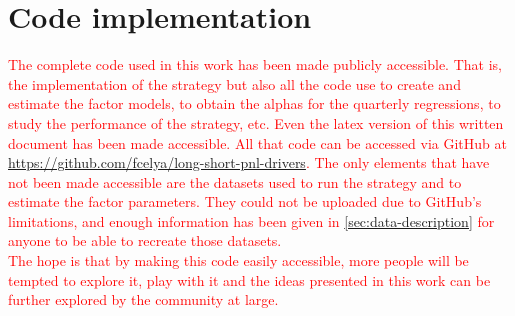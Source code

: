 \section{Code implementation}
\label{sec:code}
\textcolor{red}{The complete code used in this work has been made publicly accessible. That is, the implementation of the strategy but also all the code use to create and estimate the factor models, to obtain the alphas for the quarterly regressions, to study the performance of the strategy, etc. Even the latex version of this written document has been made accessible. All that code can be accessed via GitHub at \href{https://github.com/fcelya/long-short-pnl-drivers}{https://github.com/fcelya/long-short-pnl-drivers}. The only elements that have not been made accessible are the datasets used to run the strategy and to estimate the factor parameters. They could not be uploaded due to GitHub's limitations, and enough information has been given in \autoref{sec:data-description} for anyone to be able to recreate those datasets. \\ The hope is that by making this code easily accessible, more people will be tempted to explore it, play with it and the ideas presented in this work can be further explored by the community at large. }